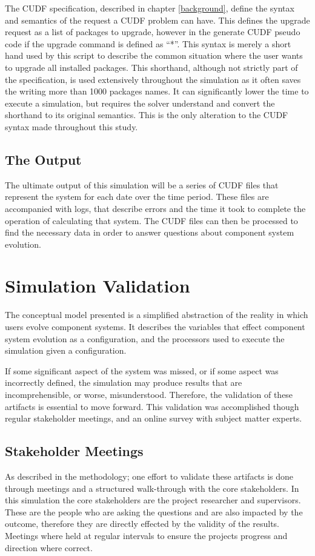 The CUDF specification, described in chapter \ref{background}, define the syntax and semantics of the request a CUDF problem can have.
This defines the upgrade request as a list of packages to upgrade,
however in the generate CUDF pseudo code if the upgrade command is defined as ``*''.
This syntax is merely a short hand used by this script to describe the common situation where the user wants to upgrade all installed packages.
This shorthand, although not strictly part of the specification, is used extensively throughout the simulation as it often saves the writing more than 1000 packages names.
It can significantly lower the time to execute a simulation, but requires the solver understand and convert the shorthand to its original semantics.
This is the only alteration to the CUDF syntax made throughout this study.

\subsection{The Output}
The ultimate output of this simulation will be a series of CUDF files that represent the system for each date over the time period.
These files are accompanied with logs, that describe errors and the time it took to complete the operation of calculating that system.
The CUDF files can then be processed to find the necessary data in order to answer questions about component system evolution.

\section{Simulation Validation}
The conceptual model presented is a simplified abstraction of the reality in which users evolve component systems.
It describes the variables that effect component system evolution as a configuration,
and the processors used to execute the simulation given a configuration.

If some significant aspect of the system was missed, or if some aspect was incorrectly defined, the simulation may produce results that are incomprehensible,
or worse, misunderstood.
Therefore, the validation of these artifacts is essential to move forward. 
This validation was accomplished though regular stakeholder meetings, and an online survey with subject matter experts.

\subsection{Stakeholder Meetings}
As described in the methodology; one effort to validate these artifacts is done through meetings and a structured walk-through with the core stakeholders.
In this simulation the core stakeholders are the project researcher and supervisors.
These are the people who are asking the questions and are also impacted by the outcome, therefore they are directly effected by the validity of the results.
Meetings where held at regular intervals to ensure the projects progress and direction where correct.


